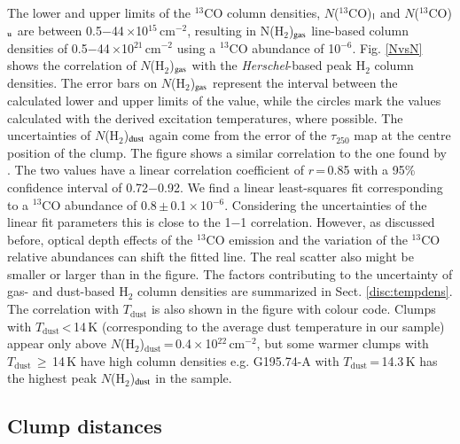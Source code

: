 \documentclass[printer]{aa}
\begin{document}
The lower and upper limits of the $^{13}$CO column densities, $N$($^{13}$CO)$_{\rm l}$ and $N$($^{13}$CO)$_{\rm u}$ are between 0.5$-$44\,$\times$10$^{15}$\,cm$^{-2}$, resulting in N(H$_2$)$_{\rm gas}$ line-based column densities of 0.5$-$44\,$\times$10$^{21}$\,cm$^{-2}$ using a $^{13}$CO abundance of 10$^{-6}$. Fig. \ref{NvsN} shows the correlation of $N$(H$_2$)$_{\rm gas}$ with the \textit{Herschel}-based peak H$_2$ column densities. The error bars on $N$(H$_2$)$_{\rm gas}$ represent the interval between the calculated lower and upper limits of the value, while the circles mark the values calculated with the derived excitation temperatures, where possible. The uncertainties of $N$(H$_2$)$_{\rm dust}$ again come from the error of the $\tau_{250}$ map at the centre position of the clump. The figure shows a similar correlation to the one found by \citet{parikka2015}. The two values have a linear correlation coefficient of $r$\,=\,0.85 with a 95\% confidence interval of 0.72$-$0.92. We find a linear least-squares fit corresponding to a $^{13}$CO abundance of 0.8\,$\pm$\,0.1\,$\times$\,10$^{-6}$. Considering the uncertainties of the linear fit parameters this is close to the 1$-$1 correlation. However, as discussed before, optical depth effects of the $^{13}$CO emission and the variation of the $^{13}$CO relative abundances can shift the fitted line. The real scatter also might be smaller or larger than in the figure. The factors contributing to the uncertainty of gas- and dust-based H$_2$ column densities are summarized in Sect. \ref{disc:tempdens}. The correlation with $T\mathrm{_{dust}}$ is also shown in the figure with colour code. Clumps with $T\mathrm{_{dust}}$\,<\,14\,K (corresponding to the average dust temperature in our sample) appear only above $N$(H$_2$)$\mathrm{_{dust}}$\,=\,0.4\,$\times$\,10$^{22}$\,cm$^{-2}$, but some warmer clumps with $T\mathrm{_{dust}}$\,$\geq$\,14\,K have high column densities e.g. G195.74-A with $T\mathrm{_{dust}}$\,=\,14.3\,K has the highest peak $N$(H$_2$)$_{\rm dust}$ in the sample. 

\subsection{Clump distances}
\label{clumpdist}
\end{document}
